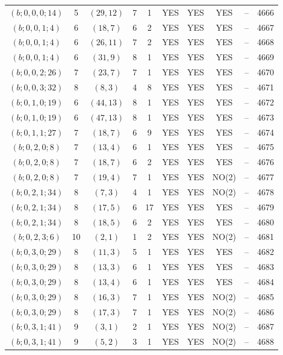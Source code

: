 \begin{longtable}{|c|c|c|c|c|c|c|c|c|c|}
$(b; 0, 0, 0; 14)$ & 5 & $(29, 12)$ & 7 & 1 & YES & YES & YES & -- & 4666\\
$(b; 0, 0, 1; 4)$ & 6 & $(18, 7)$ & 6 & 2 & YES & YES & YES & -- & 4667\\
$(b; 0, 0, 1; 4)$ & 6 & $(26, 11)$ & 7 & 2 & YES & YES & YES & -- & 4668\\
$(b; 0, 0, 1; 4)$ & 6 & $(31, 9)$ & 8 & 1 & YES & YES & YES & -- & 4669\\
$(b; 0, 0, 2; 26)$ & 7 & $(23, 7)$ & 7 & 1 & YES & YES & YES & -- & 4670\\
$(b; 0, 0, 3; 32)$ & 8 & $(8, 3)$ & 4 & 8 & YES & YES & YES & -- & 4671\\
$(b; 0, 1, 0; 19)$ & 6 & $(44, 13)$ & 8 & 1 & YES & YES & YES & -- & 4672\\
$(b; 0, 1, 0; 19)$ & 6 & $(47, 13)$ & 8 & 1 & YES & YES & YES & -- & 4673\\
$(b; 0, 1, 1; 27)$ & 7 & $(18, 7)$ & 6 & 9 & YES & YES & YES & -- & 4674\\
$(b; 0, 2, 0; 8)$ & 7 & $(13, 4)$ & 6 & 1 & YES & YES & YES & -- & 4675\\
$(b; 0, 2, 0; 8)$ & 7 & $(18, 7)$ & 6 & 2 & YES & YES & YES & -- & 4676\\
$(b; 0, 2, 0; 8)$ & 7 & $(19, 4)$ & 7 & 1 & YES & YES & NO(2) & -- & 4677\\
$(b; 0, 2, 1; 34)$ & 8 & $(7, 3)$ & 4 & 1 & YES & YES & NO(2) & -- & 4678\\
$(b; 0, 2, 1; 34)$ & 8 & $(17, 5)$ & 6 & 17 & YES & YES & YES & -- & 4679\\
$(b; 0, 2, 1; 34)$ & 8 & $(18, 5)$ & 6 & 2 & YES & YES & YES & -- & 4680\\
$(b; 0, 2, 3; 6)$ & 10 & $(2, 1)$ & 1 & 2 & YES & YES & NO(2) & -- & 4681\\
$(b; 0, 3, 0; 29)$ & 8 & $(11, 3)$ & 5 & 1 & YES & YES & YES & -- & 4682\\
$(b; 0, 3, 0; 29)$ & 8 & $(13, 3)$ & 6 & 1 & YES & YES & YES & -- & 4683\\
$(b; 0, 3, 0; 29)$ & 8 & $(13, 4)$ & 6 & 1 & YES & YES & YES & -- & 4684\\
$(b; 0, 3, 0; 29)$ & 8 & $(16, 3)$ & 7 & 1 & YES & YES & NO(2) & -- & 4685\\
$(b; 0, 3, 0; 29)$ & 8 & $(17, 3)$ & 7 & 1 & YES & YES & NO(2) & -- & 4686\\
$(b; 0, 3, 1; 41)$ & 9 & $(3, 1)$ & 2 & 1 & YES & YES & NO(2) & -- & 4687\\
$(b; 0, 3, 1; 41)$ & 9 & $(5, 2)$ & 3 & 1 & YES & YES & NO(2) & -- & 4688\\

\end{longtable}
